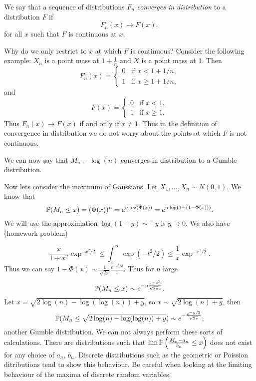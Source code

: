 \begin{defn}
    We say that a sequence of distributions $F_n$ \emph{converges in distribution} to a distribution $F$ if 
    \[F_n(x) \to F(x), \]
    for all $x$ such that $F$ is continuous at $x$.
\end{defn}
Why do we only restrict to $x$ at which $F$ is continuous? Consider the following example: $X_n$ is a point mass at $1+\frac{1}{n}$ and $X$ is a point mass at $1$. Then 
\[F_n(x) = \begin{cases}
    0 & \text{if } x < 1 + 1/n,\\
    1 & \text{if } x \ge 1 + 1/n,
\end{cases}\]
and 
\[F(x) = \begin{cases}
    0 & \text{if } x < 1,\\
    1 & \text{if } x \ge 1.
\end{cases}\]
Thus $F_n(x) \to F(x)$ if and only if $x \neq 1$. Thus in the definition of convergence in distribution we do not worry about the points at which $F$ is not continuous.

We can now say that $M_n - \log(n)$ converges in distribution to a Gumble distribution.

Now lets consider the maximum of Gaussians. Let $X_1,\ldots, X_n \sim N(0,1)$. We know that 
\[{\mathbb{P}}(M_n \le x) = (\Phi(x))^n = e^{n\log(\Phi(x))} = e^{n\log(1-(1-\Phi(x)))}. \]
We will use the approximation $\log(1-y) \sim -y$ is $y \to 0$. We also have (homework problem)

\[\frac{x}{1+x^2}\exp^{-x^2/2} \le \int_x^\infty \exp(-t^2/2) \le \frac{1}{x}\exp^{-x^2/2}. \]
Thus we can say $1-\Phi(x) \sim \frac{1}{\sqrt{2\pi}}\frac{e^{-x^2/2}}{x}$. Thus for $n$ large
\[{\mathbb{P}}(M_n \le x) \sim e^{-n \frac{e^{-x^2}}{\sqrt{2\pi}x}}. \]
Let $x = \sqrt{2\log(n)-\log(\log(n))+y}$, so $x \sim \sqrt{2\log(n)+y}$, then 
\[{\mathbb{P}}(M_n \le \sqrt{2\log(n)-\log(\log(n))+y}) \sim e^{-\frac{e^{-y/2}}{\sqrt{2\pi}}}, \]
another Gumble distribution. We can not always perform these sorts of calculations. There are distributions such that $\lim {\mathbb{P}}\left(\frac{M_n-a_n}{b_n} \le x \right)$ does not exist for any choice of $a_n$, $b_n$. Discrete distributions such as the geometric or Poission ditributions tend to show this behaviour. Be careful when looking at the limiting behaviour of the maxima of discrete random variables.
